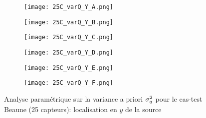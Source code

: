 \begin{figure}[p!]
	\centering
	\begin{subfigure}[t]{0.5\textwidth}
		\centering
		\texttt{[image: 25C\_varQ\_Y\_A.png]}
		\caption{}
		\label{varq_A_y}
	\end{subfigure}%
	\begin{subfigure}[t]{0.5\textwidth}
		\centering
		\texttt{[image: 25C\_varQ\_Y\_B.png]}
		\caption{}
		\label{varq_B_y}
	\end{subfigure}
	\begin{subfigure}[t]{0.5\textwidth}
		\centering
		\texttt{[image: 25C\_varQ\_Y\_C.png]}
		\caption{}
		\label{varq_C_y}
	\end{subfigure}%
	\begin{subfigure}[t]{0.5\textwidth}
		\centering
		\texttt{[image: 25C\_varQ\_Y\_D.png]}
		\caption{}
		\label{varq_D_y}
	\end{subfigure}
	\begin{subfigure}[t]{0.5\textwidth}
		\centering
		\texttt{[image: 25C\_varQ\_Y\_E.png]}
		\caption{}
		\label{varq_E_y}
	\end{subfigure}%
	\begin{subfigure}[t]{0.5\textwidth}
		\centering
		\texttt{[image: 25C\_varQ\_Y\_F.png]}
		\caption{}
		\label{varq_F_y}
	\end{subfigure}
	\caption{Analyse paramétrique sur la variance a priori $\sigma_q^2$ pour le cas-test Beaune (25 capteurs): localisation en $y$ de la source}
	\label{fig_25C_analyse_varq_y}
\end{figure}


